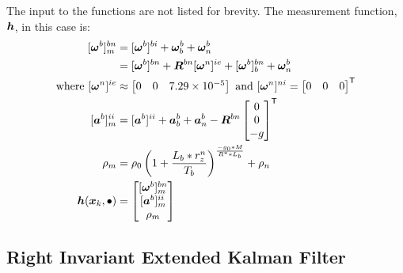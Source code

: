 The input to the functions are not listed for brevity.
The measurement function, $\bm h$, in this case is:
\begin{align} 
    \label{eq:gyroscope}
    [\m \omega^b]^{bn}_m &= [\m \omega^b]^{bi} + \m \omega^b_b + \m \omega^b_n \\
    &= [\m \omega^b]^{bn} + \m R^{bn} [\m \omega^n]^{ie} + [\m \omega^b]^{bn}_b + \m \omega^b_n \\
    \text{where } [\m \omega^n]^{ie} &\approx \begin{bmatrix}
        0 & 0 & 7.29 \times 10^{-5}
    \end{bmatrix} \text{ and } [\m \omega^n]^{ni} = \begin{bmatrix}
        0 & 0 & 0
    \end{bmatrix}\tran \\
    [\m a^b]^{ii}_m &= [\m a^b]^{ii} + \m a^b_b + \m a^b_n - \m R^{bn}
    \begin{bmatrix}
        0 \\
        0 \\
        -g
    \end{bmatrix}\tran \\
    \label{eq:barometer}
    \rho_m &= \rho_0 \left( 1 + \frac{L_b * r^n_z}{T_b} \right)^\frac{-g_0 * M}{R^* * L_b} + \rho_n \\
    \label{eq:measurementFunction}
    \fm h(\m x_k, \bullet) &= \begin{bmatrix}
        [\m \omega^b]^{bn}_m \\
        [\m a^b]^{ii}_m \\
        \rho_m
    \end{bmatrix}
\end{align}
\cite{Kok2017}
\subsection{Right Invariant Extended Kalman Filter}

